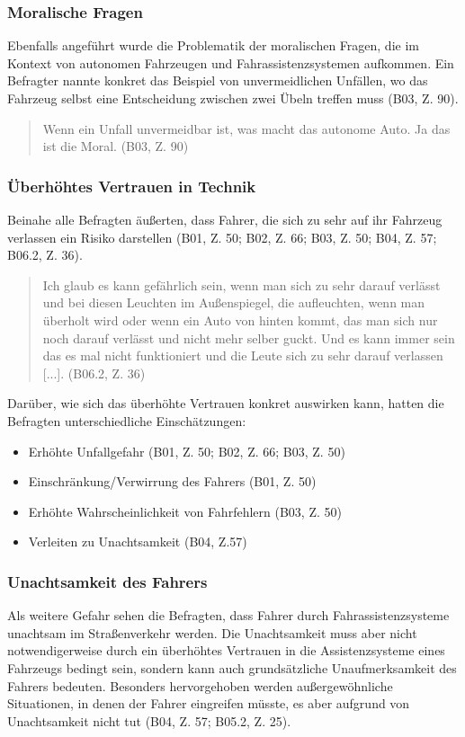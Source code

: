\documentclass[12pt]{article}
\begin{document}
\subsubsection*{Moralische Fragen}
Ebenfalls angeführt wurde die Problematik der moralischen Fragen, die im Kontext von autonomen Fahrzeugen und Fahrassistenzsystemen aufkommen. Ein Befragter nannte konkret das Beispiel von unvermeidlichen Unfällen, wo das Fahrzeug selbst eine Entscheidung zwischen zwei Übeln treffen muss (B03, Z. 90).

\begin{quote}
  Wenn ein Unfall unvermeidbar ist, was macht das autonome Auto. Ja das ist die Moral. (B03, Z. 90)
\end{quote}

\subsubsection*{Überhöhtes Vertrauen in Technik}
Beinahe alle Befragten äußerten, dass Fahrer, die sich zu sehr auf ihr Fahrzeug verlassen ein Risiko darstellen (B01, Z. 50; B02, Z. 66; B03, Z. 50; B04, Z. 57; B06.2, Z. 36).

\begin{quote}
  Ich glaub es kann gefährlich sein, wenn man sich zu sehr darauf verlässt und bei diesen Leuchten im Außenspiegel, die aufleuchten, wenn man überholt wird oder wenn ein Auto von hinten kommt, das man sich nur noch darauf verlässt und nicht mehr selber guckt. Und es kann immer sein das es mal nicht funktioniert und die Leute sich zu sehr darauf verlassen [...]. (B06.2, Z. 36)
\end{quote}

Darüber, wie sich das überhöhte Vertrauen konkret auswirken kann, hatten die Befragten unterschiedliche Einschätzungen:
\begin{itemize}
  \item Erhöhte Unfallgefahr (B01, Z. 50; B02, Z. 66; B03, Z. 50)
  \item Einschränkung/Verwirrung des Fahrers (B01, Z. 50)
  \item Erhöhte Wahrscheinlichkeit von Fahrfehlern (B03, Z. 50)
  \item Verleiten zu Unachtsamkeit (B04, Z.57)
\end{itemize}

\subsubsection*{Unachtsamkeit des Fahrers}
Als weitere Gefahr sehen die Befragten, dass Fahrer durch Fahrassistenzsysteme unachtsam im Straßenverkehr werden. Die Unachtsamkeit muss aber nicht notwendigerweise durch ein überhöhtes Vertrauen in die Assistenzsysteme eines Fahrzeugs bedingt sein, sondern kann auch grundsätzliche Unaufmerksamkeit des Fahrers bedeuten. Besonders hervorgehoben werden außergewöhnliche Situationen, in denen der Fahrer eingreifen müsste, es aber aufgrund von Unachtsamkeit nicht tut (B04, Z. 57; B05.2, Z. 25).
\end{document}
